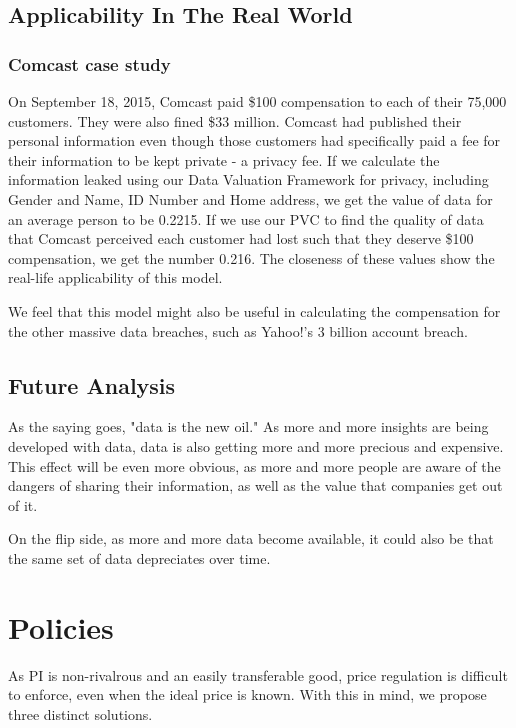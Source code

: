 \documentclass{icmmcm}
\begin{document}
\subsection{Applicability In The Real World}
\subsubsection{Comcast case study}
On September 18, 2015, Comcast paid \$100 compensation to each of their 75,000 customers. They were also fined \$33 million. Comcast had published their personal information even though those customers had specifically paid a fee for their information to be kept private - a privacy fee. 
If we calculate the information leaked using our Data Valuation Framework for privacy, including Gender and Name, ID Number and Home address, we get the value of data for an average person to be 0.2215. 
If we use our PVC to find the quality of data that Comcast perceived each customer had lost such that they deserve \$100 compensation, we get the number 0.216. The closeness of these values show the real-life applicability of this model.
\citep{data_tc}

We feel that this model might also be useful in calculating the compensation for the other massive data breaches, such as Yahoo!'s 3 billion account breach.

\subsection{Future Analysis}
As the saying goes, "data is the new oil." As more and more insights are being developed with data, data is also getting more and more precious and expensive. This effect will be even more obvious, as more and more people are aware of the dangers of sharing their information, as well as the value that companies get out of it.

On the flip side, as more and more data become available, it could also be that the same set of data depreciates over time.

\section{Policies}
As PI is non-rivalrous and an easily transferable good, price regulation is difficult to enforce, even when the ideal price is known. With this in mind, we propose three distinct solutions.
\end{document}
